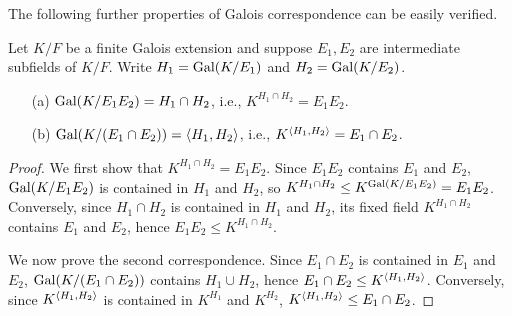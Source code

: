 The following further properties of Galois correspondence can be easily verified.
\begin{thm}\label{Galois'_thm_2}
    Let $K/F$ be a finite Galois extension and suppose $E_1, E_2$ are intermediate subfields of $K/F$.
    Write $H_1={\textrm{Gal}({K/E_1})}$ and $H_2={\textrm{Gal}({K/E_2})}$.
    \begin{enumerate}
        \item[(a)]
        {
            ${\textrm{Gal}({K/E_1E_2})}=H_1\cap H_2$, i.e., $K^{H_1\cap H_2}=E_1E_2$.
        }
        \item[(b)]
        {
            ${\textrm{Gal}({K/(E_1\cap E_2)})}={\left\langle{H_1, H_2}\right\rangle}$, i.e., $K^{{\left\langle{H_1, H_2}\right\rangle}}=E_1\cap E_2$.
        }
    \end{enumerate}
\end{thm}
\begin{proof}
    We first show that $K^{H_1\cap H_2}=E_1E_2$.
    Since $E_1E_2$ contains $E_1$ and $E_2$, ${\textrm{Gal}({K/E_1E_2})}$ is contained in $H_1$ and $H_2$, so $K^{H_1\cap H_2}\leq K^{\textrm{Gal}({K/E_1E_2})}=E_1E_2$.
    Conversely, since $H_1\cap H_2$ is contained in $H_1$ and $H_2$, its fixed field $K^{H_1\cap H_2}$ contains $E_1$ and $E_2$, hence $E_1E_2\leq K^{H_1\cap H_2}$.

    We now prove the second correspondence.
    Since $E_1\cap E_2$ is contained in $E_1$ and $E_2$, ${\textrm{Gal}({K/(E_1\cap E_2)})}$ contains $H_1\cup H_2$, hence $E_1\cap E_2\leq K^{\left\langle{H_1, H_2}\right\rangle}$.
    Conversely, since $K^{\left\langle{H_1, H_2}\right\rangle}$ is contained in $K^{H_1}$ and $K^{H_2}$, $K^{\left\langle{H_1, H_2}\right\rangle}\leq E_1\cap E_2$.
\end{proof}

